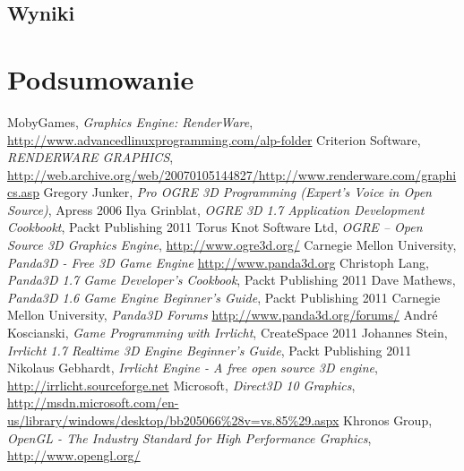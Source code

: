\documentclass[11pt]{mwrep}
\begin{document}
  \section{Wyniki}

\chapter{Podsumowanie}


\begin{thebibliography}{99}

 MobyGames, \textit{Graphics Engine: RenderWare}, \url{http://www.advancedlinuxprogramming.com/alp-folder}
 Criterion Software, \textit{RENDERWARE GRAPHICS}, \url{http://web.archive.org/web/20070105144827/http://www.renderware.com/graphics.asp}
 Gregory Junker, \textit{Pro OGRE 3D Programming (Expert's Voice in Open Source)}, Apress 2006
 Ilya Grinblat, \textit{OGRE 3D 1.7 Application Development Cookbookt}, Packt Publishing 2011
 Torus Knot Software Ltd, \textit{OGRE -- Open Source 3D Graphics Engine}, \url{http://www.ogre3d.org/}
 Carnegie Mellon University, \textit{Panda3D - Free 3D Game Engine} \url{http://www.panda3d.org}
 Christoph Lang, \textit{Panda3D 1.7 Game Developer's Cookbook}, Packt Publishing 2011
 Dave Mathews, \textit{Panda3D 1.6 Game Engine Beginner's Guide}, Packt Publishing 2011
 Carnegie Mellon University, \textit{Panda3D Forums} \url{http://www.panda3d.org/forums/}
 André Koscianski, \textit{Game Programming with Irrlicht}, CreateSpace 2011
 Johannes Stein, \textit{Irrlicht 1.7 Realtime 3D Engine Beginner's Guide}, Packt Publishing 2011
 Nikolaus Gebhardt, \textit{Irrlicht Engine - A free open source 3D engine}, \url{http://irrlicht.sourceforge.net}
 Microsoft, \textit{Direct3D 10 Graphics}, \url{http://msdn.microsoft.com/en-us/library/windows/desktop/bb205066%28v=vs.85%29.aspx}
 Khronos Group, \textit{OpenGL - The Industry Standard for High Performance Graphics}, \url{http://www.opengl.org/}

\end{thebibliography}

\end{document}
